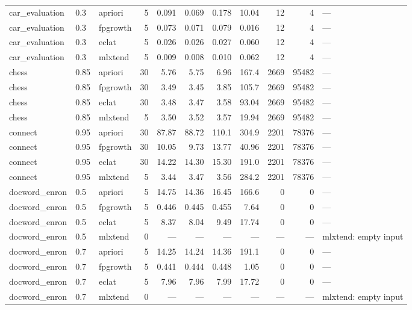 \documentclass[twocolumn,10pt]{article}
\begin{document}
\begin{longtable}{p{3.0cm}llrrrrrrrp{2.4cm}}
car\_\allowbreak{}evaluation & 0.3 & apriori & 5 & 0.091 & 0.069 & 0.178 & 10.04 & 12 & 4 & --- \\
car\_\allowbreak{}evaluation & 0.3 & fpgrowth & 5 & 0.073 & 0.071 & 0.079 & 0.016 & 12 & 4 & --- \\
car\_\allowbreak{}evaluation & 0.3 & eclat & 5 & 0.026 & 0.026 & 0.027 & 0.060 & 12 & 4 & --- \\
car\_\allowbreak{}evaluation & 0.3 & mlxtend & 5 & 0.009 & 0.008 & 0.010 & 0.062 & 12 & 4 & --- \\
chess & 0.85 & apriori & 30 & 5.76 & 5.75 & 6.96 & 167.4 & 2669 & 95482 & --- \\
chess & 0.85 & fpgrowth & 30 & 3.49 & 3.45 & 3.85 & 105.7 & 2669 & 95482 & --- \\
chess & 0.85 & eclat & 30 & 3.48 & 3.47 & 3.58 & 93.04 & 2669 & 95482 & --- \\
chess & 0.85 & mlxtend & 5 & 3.50 & 3.52 & 3.57 & 19.94 & 2669 & 95482 & --- \\
connect & 0.95 & apriori & 30 & 87.87 & 88.72 & 110.1 & 304.9 & 2201 & 78376 & --- \\
connect & 0.95 & fpgrowth & 30 & 10.05 & 9.73 & 13.77 & 40.96 & 2201 & 78376 & --- \\
connect & 0.95 & eclat & 30 & 14.22 & 14.30 & 15.30 & 191.0 & 2201 & 78376 & --- \\
connect & 0.95 & mlxtend & 5 & 3.44 & 3.47 & 3.56 & 284.2 & 2201 & 78376 & --- \\
docword\_\allowbreak{}enron & 0.5 & apriori & 5 & 14.75 & 14.36 & 16.45 & 166.6 & 0 & 0 & --- \\
docword\_\allowbreak{}enron & 0.5 & fpgrowth & 5 & 0.446 & 0.445 & 0.455 & 7.64 & 0 & 0 & --- \\
docword\_\allowbreak{}enron & 0.5 & eclat & 5 & 8.37 & 8.04 & 9.49 & 17.74 & 0 & 0 & --- \\
docword\_\allowbreak{}enron & 0.5 & mlxtend & 0 & --- & --- & --- & --- & --- & --- & mlxtend: empty input \\
docword\_\allowbreak{}enron & 0.7 & apriori & 5 & 14.25 & 14.24 & 14.36 & 191.1 & 0 & 0 & --- \\
docword\_\allowbreak{}enron & 0.7 & fpgrowth & 5 & 0.441 & 0.444 & 0.448 & 1.05 & 0 & 0 & --- \\
docword\_\allowbreak{}enron & 0.7 & eclat & 5 & 7.96 & 7.96 & 7.99 & 17.72 & 0 & 0 & --- \\
docword\_\allowbreak{}enron & 0.7 & mlxtend & 0 & --- & --- & --- & --- & --- & --- & mlxtend: empty input \\

\end{longtable}
\end{document}
